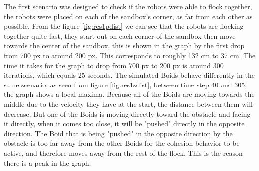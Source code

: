 The first scenario was designed to check if the robots were able to flock together, the robots were placed on each of the sandbox's corner, as far from each other as possible.
From the figure \ref{fig:res1pdist} we can see that the robots are flocking together quite fast, they start out on each corner of the sandbox then move towards the center of the sandbox, this is shown in the graph by the first drop from 700 px to around 200 px. This corresponds to roughly 132 cm to 37 cm. The time it takes for the graph to drop from 700 px to 200 px is around 300 iterations, which equals 25 seconds.
The simulated Boids behave differently in the same scenario, as seen from figure \ref{fig:res1sdist}, between time step 40 and 305, the graph shows a local maxima. Because all of the Boids are moving towards the middle due to the velocity they have at the start, the distance between them will decrease. But one of the Boids is moving directly toward the obstacle and facing it directly, when it comes too close, it will be "pushed" directly in the opposite direction. The Boid that is being "pushed" in the opposite direction by the obstacle is too far away from the other Boids for the cohesion behavior to be active, and therefore moves away from the rest of the flock. This is the reason there is a peak in the graph.

